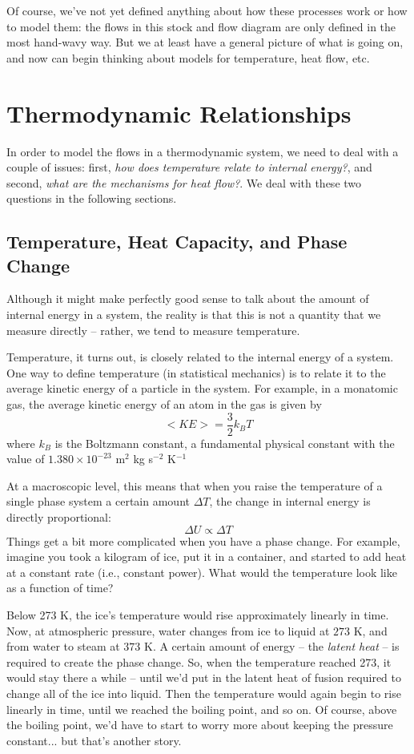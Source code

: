 \documentclass[10pt]{book}
\begin{document}
Of course, we've not yet defined anything about how these processes work or how to model them: the flows in this stock and flow diagram are only defined in the most hand-wavy way.  But we at least have a general picture of what is going on, and now can begin thinking about models for temperature, heat flow, etc.

\section{Thermodynamic Relationships}

In order to model the flows in a thermodynamic system, we need to deal with a couple of issues:  first, {\it how does temperature relate to internal energy?}, and second, {\it what are the mechanisms for heat flow?}.  We deal with these two questions in the following sections.


\subsection{Temperature, Heat Capacity, and Phase Change}

Although it might make perfectly good sense to talk about the amount of internal energy in a system, the reality is that this is not a quantity that we measure directly -- rather, we tend to measure temperature.  

Temperature, it turns out, is closely related to the internal energy of a system.  One way to define temperature (in statistical mechanics) is to relate it to the average kinetic energy of a particle in the system.  For example, in a monatomic gas, the average kinetic energy of an atom in the gas is given by
$$<KE> = \frac{3}{2} k_B T$$
where $k_B$ is the Boltzmann constant, a fundamental physical constant with the value of $1.380 \times 10^{-23}$ m$^2$ kg s$^{-2}$ K$^{-1}$

At a macroscopic level, this means that when you raise the temperature of a single phase system a certain amount $\Delta T$, the change in internal energy is directly proportional:
$$\Delta U \propto \Delta T$$
Things get a bit more complicated when you have a phase change.  
For example, imagine you took a kilogram of ice, put it in a container, and started to add heat at a constant rate (i.e., constant power).  What would the temperature look like as a function of time?

Below 273 K, the ice's temperature would rise approximately linearly in time.   Now, at atmospheric pressure, water changes from ice to liquid at $273$ K, and from water to steam at $373$ K.  A certain amount of energy -- the {\it latent heat} --  is required to create the phase change. So, when the temperature reached 273, it would stay there a while -- until we'd put in the latent heat of fusion required to change all of the ice into liquid.  Then the temperature would again begin to rise linearly in time, until we reached the boiling point, and so on.  Of course, above the boiling point, we'd have to start to worry more about keeping the pressure constant... but that's another story.
\end{document}

